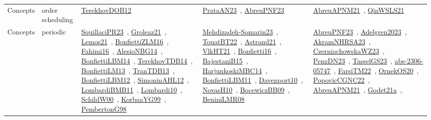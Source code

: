 {\begin{longtable}{lp{3cm}>{\raggedright\arraybackslash}p{6cm}>{\raggedright\arraybackslash}p{6cm}>{\raggedright\arraybackslash}p{8cm}}
Concepts & order scheduling & \href{../works/TerekhovDOB12.pdf}{TerekhovDOB12}~\cite{TerekhovDOB12} & \href{../works/PrataAN23.pdf}{PrataAN23}~\cite{PrataAN23}, \href{../works/AbreuPNF23.pdf}{AbreuPNF23}~\cite{AbreuPNF23} & \href{../works/AbreuAPNM21.pdf}{AbreuAPNM21}~\cite{AbreuAPNM21}, \href{../works/QinWSLS21.pdf}{QinWSLS21}~\cite{QinWSLS21}\\
Concepts & periodic & \href{../works/SquillaciPR23.pdf}{SquillaciPR23}~\cite{SquillaciPR23}, \href{../works/Groleaz21.pdf}{Groleaz21}~\cite{Groleaz21}, \href{../works/Lemos21.pdf}{Lemos21}~\cite{Lemos21}, \href{../works/BonfiettiZLM16.pdf}{BonfiettiZLM16}~\cite{BonfiettiZLM16}, \href{../works/Fahimi16.pdf}{Fahimi16}~\cite{Fahimi16}, \href{../works/AlesioNBG14.pdf}{AlesioNBG14}~\cite{AlesioNBG14}, \href{../works/BonfiettiLBM14.pdf}{BonfiettiLBM14}~\cite{BonfiettiLBM14}, \href{../works/TerekhovTDB14.pdf}{TerekhovTDB14}~\cite{TerekhovTDB14}, \href{../works/BonfiettiLM13.pdf}{BonfiettiLM13}~\cite{BonfiettiLM13}, \href{../works/TranTDB13.pdf}{TranTDB13}~\cite{TranTDB13}, \href{../works/BonfiettiLBM12.pdf}{BonfiettiLBM12}~\cite{BonfiettiLBM12}, \href{../works/SimoninAHL12.pdf}{SimoninAHL12}~\cite{SimoninAHL12}, \href{../works/LombardiBMB11.pdf}{LombardiBMB11}~\cite{LombardiBMB11}, \href{../works/Lombardi10.pdf}{Lombardi10}~\cite{Lombardi10}, \href{../works/SchildW00.pdf}{SchildW00}~\cite{SchildW00}, \href{../works/KorbaaYG99.pdf}{KorbaaYG99}~\cite{KorbaaYG99}, \href{../works/PembertonG98.pdf}{PembertonG98}~\cite{PembertonG98} & \href{../works/Mehdizadeh-Somarin23.pdf}{Mehdizadeh-Somarin23}~\cite{Mehdizadeh-Somarin23}, \href{../works/TouatBT22.pdf}{TouatBT22}~\cite{TouatBT22}, \href{../works/Astrand21.pdf}{Astrand21}~\cite{Astrand21}, \href{../works/VlkHT21.pdf}{VlkHT21}~\cite{VlkHT21}, \href{../works/Bonfietti16.pdf}{Bonfietti16}~\cite{Bonfietti16}, \href{../works/BajestaniB15.pdf}{BajestaniB15}~\cite{BajestaniB15}, \href{../works/HarjunkoskiMBC14.pdf}{HarjunkoskiMBC14}~\cite{HarjunkoskiMBC14}, \href{../works/BonfiettiLBM11.pdf}{BonfiettiLBM11}~\cite{BonfiettiLBM11}, \href{../works/Davenport10.pdf}{Davenport10}~\cite{Davenport10}, \href{../works/NovasH10.pdf}{NovasH10}~\cite{NovasH10}, \href{../works/BocewiczBB09.pdf}{BocewiczBB09}~\cite{BocewiczBB09}, \href{../works/BeniniLMR08.pdf}{BeniniLMR08}~\cite{BeniniLMR08} & \href{../works/AbreuPNF23.pdf}{AbreuPNF23}~\cite{AbreuPNF23}, \href{../works/Adelgren2023.pdf}{Adelgren2023}~\cite{Adelgren2023}, \href{../works/AkramNHRSA23.pdf}{AkramNHRSA23}~\cite{AkramNHRSA23}, \href{../works/CzerniachowskaWZ23.pdf}{CzerniachowskaWZ23}~\cite{CzerniachowskaWZ23}, \href{../works/PenzDN23.pdf}{PenzDN23}~\cite{PenzDN23}, \href{../works/TasselGS23.pdf}{TasselGS23}~\cite{TasselGS23}, \href{../works/abs-2306-05747.pdf}{abs-2306-05747}~\cite{abs-2306-05747}, \href{../works/FarsiTM22.pdf}{FarsiTM22}~\cite{FarsiTM22}, \href{../works/OrnekOS20.pdf}{OrnekOS20}~\cite{OrnekOS20}, \href{../works/PopovicCGNC22.pdf}{PopovicCGNC22}~\cite{PopovicCGNC22}, \href{../works/AbreuAPNM21.pdf}{AbreuAPNM21}~\cite{AbreuAPNM21}, \href{../works/Godet21a.pdf}{Godet21a}~\cite{Godet21a}, 
\end{longtable}}
